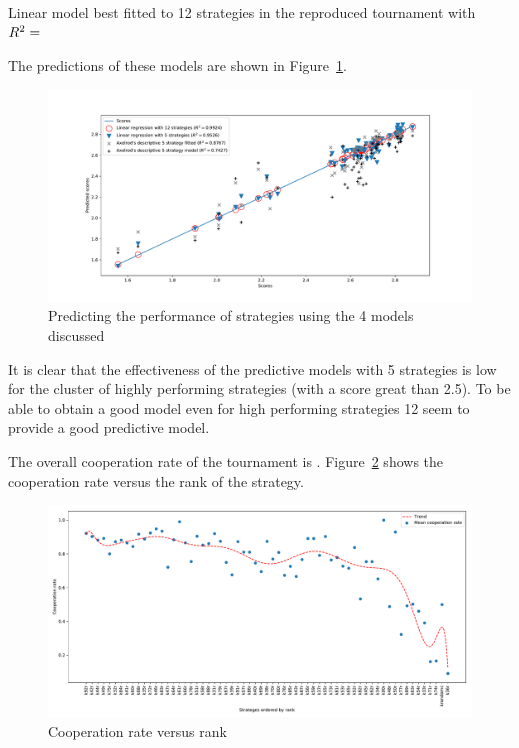 \documentclass{article}
\begin{document}
\begin{table}[!hbtp]
        \centering
        
        \caption{Linear model best fitted to 12 strategies in the reproduced tournament
                 with
             \(R^2=\protect\)}
        \label{tbl:original_tournament_predictive_12_model}
\end{table}

The predictions of these models are shown in
Figure~\ref{fig:original_tournament_predictive_score_models}.

\begin{figure}[!hbtp]
    \centering
    \includegraphics[width=.8\textwidth]{assets/original_tournament_predictive_score_models.pdf}
    \caption{Predicting the performance of strategies using the 4 models
             discussed}
    \label{fig:original_tournament_predictive_score_models}
\end{figure}

It is clear that the effectiveness of the predictive models with 5 strategies is
low for the cluster of highly performing strategies (with a score great than
2.5). To be able to obtain a good model even for high performing strategies 12
seem to provide a good predictive model.

The overall cooperation rate of the tournament
is .
Figure~\ref{fig:original_tournament_cooperation_rate_versus_rank} shows the
cooperation rate versus the rank of the strategy.

\begin{figure}[!hbtp]
    \centering
    \includegraphics[width=.8\textwidth]{assets/original_tournament_cooperation_rate_versus_rank.pdf}
    \caption{Cooperation rate versus rank}
    \label{fig:original_tournament_cooperation_rate_versus_rank}
\end{figure}
\end{document}
